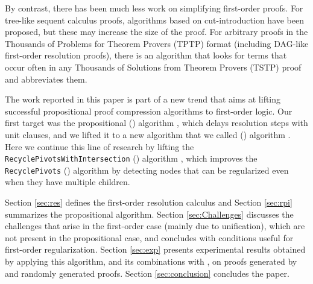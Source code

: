 By contrast, there has been much less work on simplifying first-order proofs. 
For tree-like sequent calculus proofs, algorithms based on cut-introduction \cite{BrunoLPAR,Hetzl} have been proposed, but these may increase the size of the proof. 
For arbitrary proofs in the Thousands of Problems for Theorem Provers (TPTP) \cite{TPTP} format (including DAG-like first-order resolution proofs), there is an algorithm \cite{LPARCzech} that looks for terms that occur often in any Thousands of Solutions from Theorem Provers (TSTP) \cite{TPTP} proof and abbreviates them. 


The work reported in this paper is part of a new trend that aims at lifting successful propositional proof compression algorithms to first-order logic. Our first target was the propositional {\LowerUnits} ({\LU}) algorithm \cite{LURPI}, which delays resolution steps with unit clauses, and we lifted it to a new algorithm that we called
{\SFOLowerUnits} 
({\GFOLU}) algorithm \cite{GFOLU}. Here we continue this line of research by lifting the 
\texttt{Recycle\-PivotsWithIntersection}
({\RPI}) algorithm \cite{LURPI}, which improves the \texttt{RecyclePivots} ({\RP}) algorithm \cite{RP08} by detecting nodes that can be regularized even when they have multiple children. 


Section \ref{sec:res} defines the first-order resolution calculus and Section \ref{sec:rpi} summarizes the propositional {\RPI} algorithm. Section \ref{sec:Challenges} discusses the challenges that arise in the first-order case (mainly due to unification), which are not present in the propositional case, and concludes with conditions useful for first-order regularization. Section \ref{sec:exp} presents experimental results obtained by applying this algorithm, and its combinations with {\GFOLU}, on proofs generated by {\SPASS} and randomly generated proofs. Section \ref{sec:conclusion} concludes the paper.


